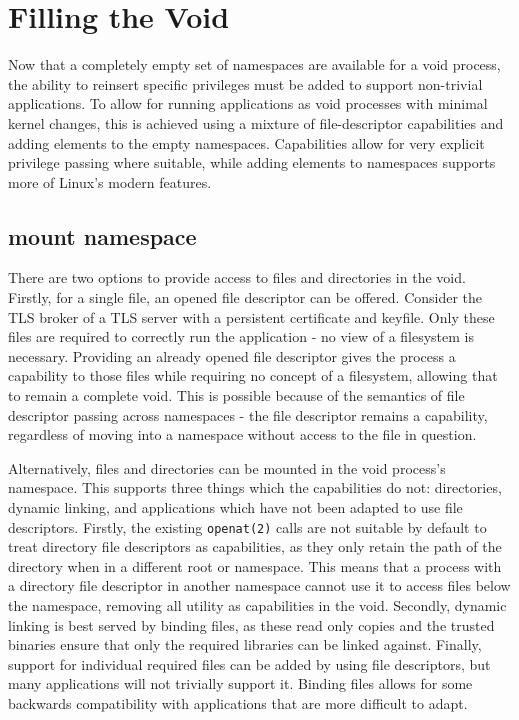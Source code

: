 \documentclass[12pt,a4paper,twoside]{report}
\begin{document}
\chapter{Filling the Void}
\label{chap:filling-the-void}

Now that a completely empty set of namespaces are available for a void process, the ability to reinsert specific privileges must be added to support non-trivial applications. To allow for running applications as void processes with minimal kernel changes, this is achieved using a mixture of file-descriptor capabilities and adding elements to the empty namespaces. Capabilities allow for very explicit privilege passing where suitable, while adding elements to namespaces supports more of Linux's modern features.

\section{mount namespace}
\label{sec:filling-mount}

There are two options to provide access to files and directories in the void. Firstly, for a single file, an opened file descriptor can be offered. Consider the TLS broker of a TLS server with a persistent certificate and keyfile. Only these files are required to correctly run the application - no view of a filesystem is necessary. Providing an already opened file descriptor gives the process a capability to those files while requiring no concept of a filesystem, allowing that to remain a complete void. This is possible because of the semantics of file descriptor passing across namespaces - the file descriptor remains a capability, regardless of moving into a namespace without access to the file in question.

Alternatively, files and directories can be mounted in the void process's namespace. This supports three things which the capabilities do not: directories, dynamic linking, and applications which have not been adapted to use file descriptors. Firstly, the existing \texttt{openat(2)} calls are not suitable by default to treat directory file descriptors as capabilities, as they only retain the path of the directory when in a different root or namespace. This means that a process with a directory file descriptor in another namespace cannot use it to access files below the namespace, removing all utility as capabilities in the void. Secondly, dynamic linking is best served by binding files, as these read only copies and the trusted binaries ensure that only the required libraries can be linked against. Finally, support for individual required files can be added by using file descriptors, but many applications will not trivially support it. Binding files allows for some backwards compatibility with applications that are more difficult to adapt.
\end{document}
